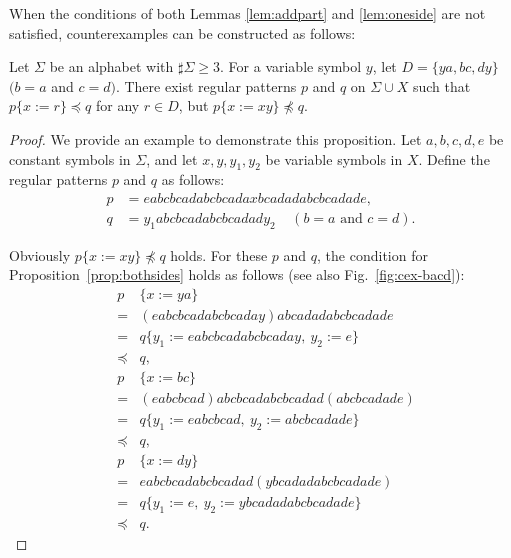 When the conditions of both Lemmas \ref{lem:addpart} and \ref{lem:oneside} are not satisfied, counterexamples can be constructed as follows:

\begin{prop}\label{prop:bothsides}
  Let $\Sigma$ be an alphabet with $\sharp \Sigma \ge 3$.
  For a variable symbol $y$, let $D= \{ ya, bc, dy \}$ $(b = a$ and $c = d)$.
  There exist regular patterns $p$ and $q$ on $\Sigma\cup X$ such that $p \{ x := r \} \preceq q$ for any $r \in D$, but $p \{ x := xy \} \not \preceq q$.
\end{prop}

\begin{proof}
We provide an example to demonstrate this proposition.
Let $a,b,c,d,e$ be constant symbols in $\Sigma$, and let 
$x,y,y_{1},y_{2}$ be variable symbols in $X$.
Define the regular patterns $p$ and $q$ as follows:
\begin{align*}
p &= eabcbcadabcbcadaxbcadadabcbcadade,\\
q &= y_{1}abcbcadabcbcadady_{2}~~~~~(b = a\mbox{~and~}c = d).
\end{align*}

\noindent
Obviously $p \{ x:=xy \} \not \preceq q$ holds.
For these $p$ and $q$, the condition for Proposition~\ref{prop:bothsides} holds as follows (see also Fig.~\ref{fig:cex-bacd}):
\begin{eqnarray*}
&p& \{ x:=ya \} \\ 
& = & (eabcbcadabcbcaday)abcadadabcbcadade\\
& = & q \{ y_{1} := eabcbcadabcbcaday,~y_{2}:=e \} \\
& \preceq & q,\\
&p& \{ x:=bc \}  \\
& = & (eabcbcad)abcbcadabcbcadad(abcbcadade) \\
& = & q \{ y_{1} := eabcbcad,~y_{2} := abcbcadade \} \\
& \preceq & q,\\
&p& \{ x:=dy \}  \\
& = & eabcbcadabcbcadad(ybcadadabcbcadade) \\
& = & q \{ y_{1}:=e,~y_{2} := ybcadadabcbcadade \} \\
& \preceq & q.
\end{eqnarray*}
\end{proof}


